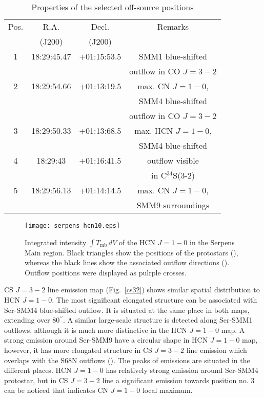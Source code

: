 \documentclass{aa}
\begin{document}
\begin{table}
\caption{Properties of the selected off-source positions}             %
\label{table:3}      %
\centering                          %
\begin{tabular}{c c c c} 
\hline\hline 
Pos. & R.A. & Decl. & Remarks\\
 & (J200) & (J200) & \\
\hline
1 & 18:29:45.47 & +01:15:53.5 & SMM1 blue-shifted \\
 & & & outflow in CO $J=3-2$\\
\hline
2 & 18:29:54.66 & +01:13:19.5 & max. CN $J=1-0$, \\
 & & & SMM4 blue-shifted \\
 & & & outflow in CO $J=3-2$\\
\hline
3 & 18:29:50.33 & +01:13:68.5 & max. HCN $J=1-0$, \\
 & & & SMM4 blue-shifted \\
\hline
4 & 18:29:43 & +01:16:41.5 & outflow visible \\
 & & &  in C$^{34}$S(3-2)\\
\hline
5 & 18:29:56.13 & +01:14:14.5 & max. CN $J=1-0$, \\
 & & & SMM9 surroundings\\
\hline
\end{tabular}
\end{table}



\begin{figure}
   \centering
   \texttt{[image: serpens\_hcn10.eps]}
      \caption{Integrated intensity $\int T_\mathrm{mb}\,dV$ of the HCN $J=1-0$ in the Serpens Main region. Black triangles show the positions of the protostars (\cite{Sur16}), whereas the black lines show the associated outflow directions (\cite{Yil15}). Outflow positions were displayed as pulrple crosses.}
         \label{hcn10}
   \end{figure}

CS $J=3-2$ line emission map (Fig.~\ref{cs32}) shows similar spatial distribution to HCN $J=1-0$. The most significant elongated structure can be associated with Ser-SMM4 blue-shifted outflow. It is situated at the same place in both maps, extending over 80$^{\prime\prime}$. A similar large-scale structure is detected along Ser-SMM1 outflows, although it is much more distinctive in the HCN $J=1-0$ map. A strong emission around Ser-SMM9 have a circular shape in HCN $J=1-0$ map, however, it has more elongated structure in CS $J=3-2$ line emission which overlaps with the S68N outflows (\cite{Kri10}). The peaks of emissions are situated in the different places. HCN $J=1-0$ has relatively strong emission around Ser-SMM4 protostar, but in CS $J=3-2$ line a significant emission towards position no. 3 can be noticed that indicates CN $J=1-0$ local maximum. 
\end{document}
